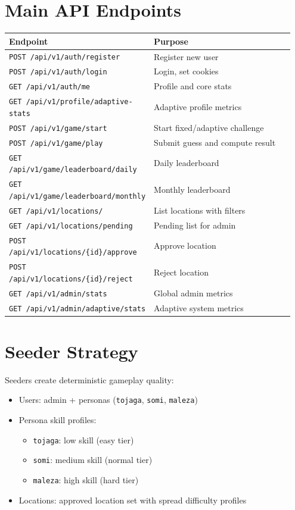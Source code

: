 \documentclass[12pt,a4paper]{article}
\begin{document}
\section{Main API Endpoints}
\begin{longtable}{|p{0.30\linewidth}|p{0.65\linewidth}|}
\hline
\textbf{Endpoint} & \textbf{Purpose} \\
\hline
\texttt{POST /api/v1/auth/register} & Register new user \\
\hline
\texttt{POST /api/v1/auth/login} & Login, set cookies \\
\hline
\texttt{GET /api/v1/auth/me} & Profile and core stats \\
\hline
\texttt{GET /api/v1/profile/adaptive-stats} & Adaptive profile metrics \\
\hline
\texttt{POST /api/v1/game/start} & Start fixed/adaptive challenge \\
\hline
\texttt{POST /api/v1/game/play} & Submit guess and compute result \\
\hline
\texttt{GET /api/v1/game/leaderboard/daily} & Daily leaderboard \\
\hline
\texttt{GET /api/v1/game/leaderboard/monthly} & Monthly leaderboard \\
\hline
\texttt{GET /api/v1/locations/} & List locations with filters \\
\hline
\texttt{GET /api/v1/locations/pending} & Pending list for admin \\
\hline
\texttt{POST /api/v1/locations/\{id\}/approve} & Approve location \\
\hline
\texttt{POST /api/v1/locations/\{id\}/reject} & Reject location \\
\hline
\texttt{GET /api/v1/admin/stats} & Global admin metrics \\
\hline
\texttt{GET /api/v1/admin/adaptive/stats} & Adaptive system metrics \\
\hline
\end{longtable}

\section{Seeder Strategy}
Seeders create deterministic gameplay quality:
\begin{itemize}[noitemsep]
  \item Users: admin + personas (\texttt{tojaga}, \texttt{somi}, \texttt{maleza})
  \item Persona skill profiles:
  \begin{itemize}[noitemsep]
    \item \texttt{tojaga}: low skill (easy tier)
    \item \texttt{somi}: medium skill (normal tier)
    \item \texttt{maleza}: high skill (hard tier)
  \end{itemize}
  \item Locations: approved location set with spread difficulty profiles
\end{itemize}
\end{document}
